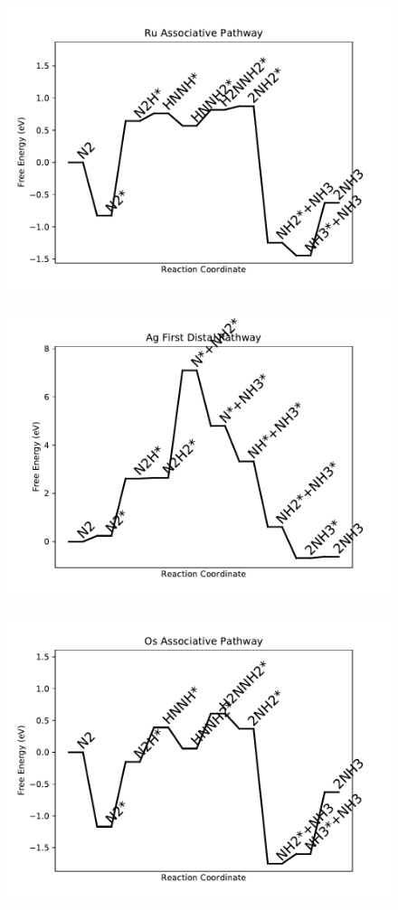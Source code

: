 \begin{figure}
\includegraphics[width=0.8\linewidth]{data/plots/Ru_associative.pdf}
\label{fig:Ru_associative}
\end{figure}

\begin{figure}
\includegraphics[width=0.8\linewidth]{data/plots/Ag_distal_1.pdf}
\label{fig:Ag_distal_1}
\end{figure}

\begin{figure}
\includegraphics[width=0.8\linewidth]{data/plots/Os_associative.pdf}
\label{fig:Os_associative}
\end{figure}

